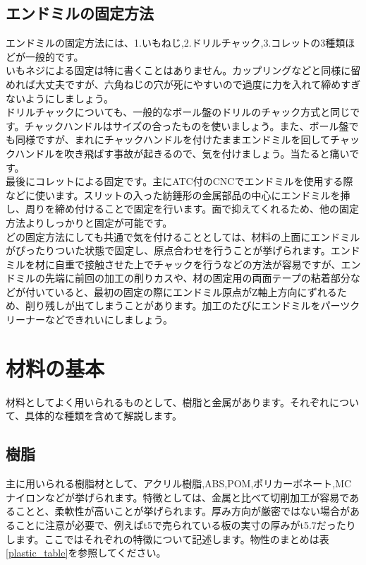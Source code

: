 \documentclass[b5paper, 9pt, twocolumn, titlepage,openany]{jsbook}%
\begin{document}

\subsection{エンドミルの固定方法}

エンドミルの固定方法には、1.いもねじ,2.ドリルチャック,3.コレットの3種類ほどが一般的です。\\
いもネジによる固定は特に書くことはありません。カップリングなどと同様に留めれば大丈夫ですが、六角ねじの穴が死にやすいので過度に力を入れて締めすぎないようにしましょう。\\
ドリルチャックについても、一般的なボール盤のドリルのチャック方式と同じです。チャックハンドルはサイズの合ったものを使いましょう。また、ボール盤でも同様ですが、まれにチャックハンドルを付けたままエンドミルを回してチャックハンドルを吹き飛ばす事故が起きるので、気を付けましょう。当たると痛いです。\\
最後にコレットによる固定です。主にATC付のCNCでエンドミルを使用する際などに使います。スリットの入った紡錘形の金属部品の中心にエンドミルを挿し、周りを締め付けることで固定を行います。面で抑えてくれるため、他の固定方法よりしっかりと固定が可能です。\\
どの固定方法にしても共通で気を付けることとしては、材料の上面にエンドミルがぴったりついた状態で固定し、原点合わせを行うことが挙げられます。エンドミルを材に自重で接触させた上でチャックを行うなどの方法が容易ですが、エンドミルの先端に前回の加工の削りカスや、材の固定用の両面テープの粘着部分などが付いていると、最初の固定の際にエンドミル原点がZ軸上方向にずれるため、削り残しが出てしまうことがあります。加工のたびにエンドミルをパーツクリーナーなどできれいにしましょう。\\

\clearpage
\section{材料の基本}

材料としてよく用いられるものとして、樹脂と金属があります。それぞれについて、具体的な種類を含めて解説します。\\

\subsection{樹脂}

主に用いられる樹脂材として、アクリル樹脂,ABS,POM,ポリカーボネート,MCナイロンなどが挙げられます。特徴としては、金属と比べて切削加工が容易であることと、柔軟性が高いことが挙げられます。厚み方向が厳密ではない場合があることに注意が必要で、例えばt5で売られている板の実寸の厚みがt5.7だったりします。ここではそれぞれの特徴について記述します。物性のまとめは表\ref{plastic_table}を参照してください。\cite{pla_properties}\\
\end{document}
